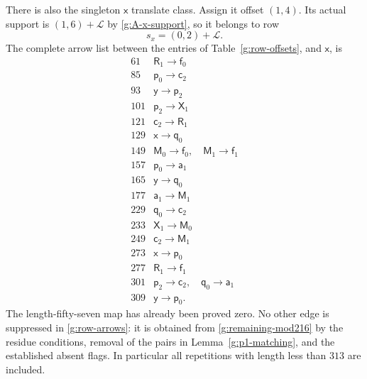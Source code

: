 There is also the singleton $\mathsf x$ translate class.
Assign it offset $(1,4)$.  Its actual support is
$(1,6)+\mathcal L$ by \eqref{g:A-x-support}, so it
belongs to row
\begin{equation}\label{g:x-row}
 s_x=(0,2)+\mathcal L.
\end{equation}
The complete arrow list between the entries of
Table~\ref{g:row-offsets}, and $\mathsf x$, is
\begin{equation}\label{g:row-arrows}
\begin{array}{c|l}
61&\mathsf R_1\longrightarrow\mathsf f_0\\
85&\mathsf p_0\longrightarrow\mathsf c_2\\
93&\mathsf y\longrightarrow\mathsf p_2\\
101&\mathsf p_2\longrightarrow\mathsf X_1\\
121&\mathsf c_2\longrightarrow\mathsf R_1\\
129&\mathsf x\longrightarrow\mathsf q_0\\
149&\mathsf M_0\longrightarrow\mathsf f_0,\quad
     \mathsf M_1\longrightarrow\mathsf f_1\\
157&\mathsf p_0\longrightarrow\mathsf a_1\\
165&\mathsf y\longrightarrow\mathsf q_0\\
177&\mathsf a_1\longrightarrow\mathsf M_1\\
229&\mathsf q_0\longrightarrow\mathsf c_2\\
233&\mathsf X_1\longrightarrow\mathsf M_0\\
249&\mathsf c_2\longrightarrow\mathsf M_1\\
273&\mathsf x\longrightarrow\mathsf p_0\\
277&\mathsf R_1\longrightarrow\mathsf f_1\\
301&\mathsf p_2\longrightarrow\mathsf c_2,\quad
     \mathsf q_0\longrightarrow\mathsf a_1\\
309&\mathsf y\longrightarrow\mathsf p_0.
\end{array}
\end{equation}
The length-fifty-seven map has already been proved zero.
No other edge is suppressed in \eqref{g:row-arrows}:
it is obtained from \eqref{g:remaining-mod216} by the
residue conditions, removal of the pairs in
Lemma~\ref{g:p1-matching}, and the established absent
flags.  In particular all repetitions with length
less than $313$ are included.

